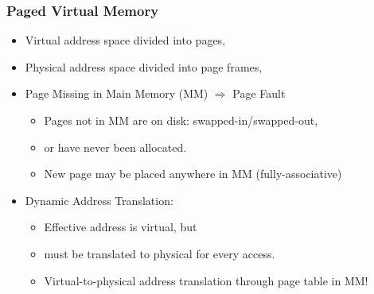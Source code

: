 \documentclass{beamer}
\begin{document}
\begin{frame}[fragile,t]
\frametitle{Paged Virtual Memory}

\begin{itemize}
    \item Virtual address space divided into pages,\bigskip
    \item Physical address space divided into page frames,\bigskip
    \item Page Missing in Main Memory (MM) $\Rightarrow$ Page Fault
        \begin{itemize}
            \item Pages not in MM are on disk: swapped-in/swapped-out,
            \item or have never been allocated.
            \item New page may be placed anywhere in MM (fully-associative)
        \end  {itemize}\bigskip
    \item Dynamic Address Translation:
        \begin{itemize}
            \item Effective address is virtual, but
            \item must be translated to physical for every access.
            \item Virtual-to-physical address translation through page table in MM!
        \end  {itemize}
\end  {itemize}

\end{frame}
\end{document}
